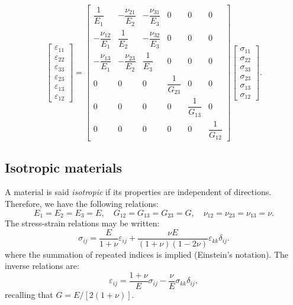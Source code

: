 \begin{equation}
\label{chap2:orthotropic2}
	\begin{bmatrix}
		\varepsilon_{11} \\
		\varepsilon_{22} \\
		\varepsilon_{33} \\
		\varepsilon_{23} \\
		\varepsilon_{13} \\
		\varepsilon_{12}
	\end{bmatrix}
= 
	\begin{bmatrix}
		\dfrac{1}{E_1} & -\dfrac{\nu_{21}}{E_2} & -\dfrac{\nu_{31}}{E_3} &       0       &       0       &       0 \\
		-\dfrac{\nu_{12}}{E_1} & \dfrac{1}{E_2} & -\dfrac{\nu_{32}}{E_3} &       0       &       0       &       0 \\
		-\dfrac{\nu_{13}}{E_1} & -\dfrac{\nu_{23}}{E_2} & \dfrac{1}{E_3} &       0       &       0       &       0 \\
		      0       &        0     &        0       & \dfrac{1}{G_{23}} &       0       &       0 \\
		      0       &        0     &        0       &       0       & \dfrac{1}{G_{13}}&       0 \\
		      0       &        0     &        0       &       0       &       0       & \dfrac{1}{G_{12}}
	\end{bmatrix}
	\begin{bmatrix}
		\sigma_{11} \\
		\sigma_{22} \\
		\sigma_{33} \\
		\sigma_{23} \\
		\sigma_{13} \\
		\sigma_{12}
	\end{bmatrix}
	.
\end{equation}

	\subsection{Isotropic materials} \label{chap2:isotropic}
A material is said \emph{isotropic} if its properties are independent of directions. Therefore, we have the following relations:
\begin{equation}
E_1 = E_2 = E_3 = E, \quad G_{12} = G_{13} = G_{23} = G, \quad \nu_{12} = \nu_{23} = \nu_{13} = \nu.
\end{equation}
The stress-strain relations may be written:
\begin{equation}
\sigma_{ij} = \frac{E}{1+\nu} \varepsilon_{ij} + \frac{\nu E}{(1+\nu)(1-2\nu)} \varepsilon_{kk}\delta_{ij}.
\end{equation}	
where the summation of repeated indices is implied (Einstein's notation). The inverse relations are:
\begin{equation}
\varepsilon_{ij} = \frac{1+\nu}{E} \sigma_{ij} - \frac{\nu}{E} \sigma_{kk} \delta_{ij},
\end{equation}
recalling that $G = E/[2(1+\nu)]$.
	
